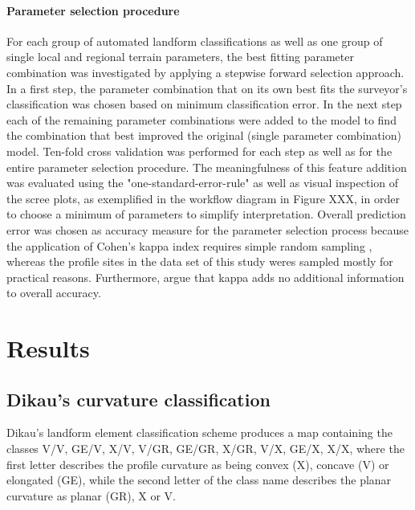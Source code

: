 \documentclass[preprint,12pt,authoryear]{elsarticle}
\begin{document}
\paragraph{Parameter selection procedure} For each group of automated landform classifications as well as one group of single local and regional terrain parameters, the best fitting parameter combination was investigated by applying a stepwise forward selection approach. In a first step, the parameter combination that on its own best fits the surveyor's classification was chosen based on minimum classification error. In the next step each of the remaining parameter combinations were added to the model to find the combination that best improved the original (single parameter combination) model. Ten-fold cross validation was performed for each step as well as for the entire parameter selection procedure. The meaningfulness of this feature addition was evaluated using the "one-standard-error-rule" \citep{James2013} as well as visual inspection of the scree plots, as exemplified in the workflow diagram in Figure XXX, in order to choose a minimum of parameters to simplify interpretation. Overall prediction error was chosen as accuracy measure for the parameter selection process because the application of Cohen's kappa index requires simple random sampling \citep{Congalton1991}, whereas the profile sites in the data set of this study weres sampled mostly for practical reasons. Furthermore, \cite{Pontius2011} argue that kappa adds no additional information to overall accuracy.
\section{Results}
\subsection{Dikau's curvature classification}
Dikau's landform element classification scheme produces a map containing the classes V/V, GE/V, X/V, V/GR, GE/GR, X/GR, V/X, GE/X, X/X, where the first letter describes the profile curvature as being convex (X), concave (V) or elongated (GE), while the second letter of the class name describes the planar curvature as planar (GR), X or V.
\end{document}
